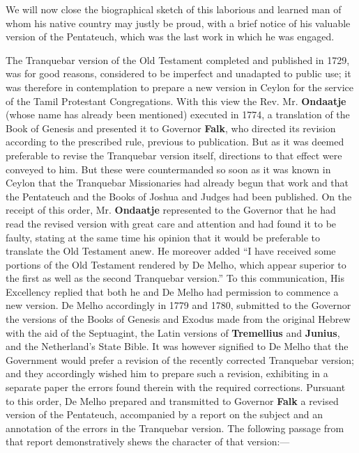 \documentclass{article}
\begin{document}
We will now close the biographical sketch of this laborious and learned man of whom his native country may justly be proud, with a brief notice of his valuable version of the Pentateuch, which was the last work in which he was engaged.

The Tranquebar version of the Old Testament completed and published in 1729, was for good reasons, considered to be imperfect and unadapted to public use; it was therefore in contemplation to prepare a new version in Ceylon for the service of the Tamil Protestant Congregations. With this view the Rev. Mr. \textbf{Ondaatje} (whose name has already been mentioned) executed in 1774, a translation of the Book of Genesis and presented it to Governor \textbf{Falk}, who directed its revision according to the prescribed rule, previous to publication. But as it was deemed preferable to revise the Tranquebar version itself, directions to that effect were conveyed to him. But these were countermanded so soon as it was known in Ceylon that the Tranquebar Missionaries had already begun that work and that the Pentateuch and the Books of Joshua and Judges had been published. On the receipt of this order, Mr. \textbf{Ondaatje} represented to the Governor that he had read the revised version with great care and attention and had found it to be faulty, stating at the same time his opinion that it would be preferable to translate the Old Testament anew. He moreover added ``I have received some portions of the Old Testament rendered by De Melho, which appear superior to the first as well as the second Tranquebar version.'' To this communication, His Excellency replied that both he and De Melho had permission to commence a new version. De Melho accordingly in 1779 and 1780, submitted to the Governor the versions of the Books of Genesis and Exodus made from the original Hebrew with the aid of the Septuagint, the Latin versions of \textbf{Tremellius} and \textbf{Junius}, and the Netherland's State Bible. It was however signified to De Melho that the Government would prefer a revision of the recently corrected Tranquebar version; and they accordingly wished him to prepare such a revision, exhibiting in a separate paper the errors found therein with the required corrections. Pursuant to this order, De Melho prepared and transmitted to Governor \textbf{Falk} a revised version of the Pentateuch, accompanied by a report on the subject and an annotation of the errors in the Tranquebar version. The following passage from that report demonstratively shews the character of that version:---
\end{document}
